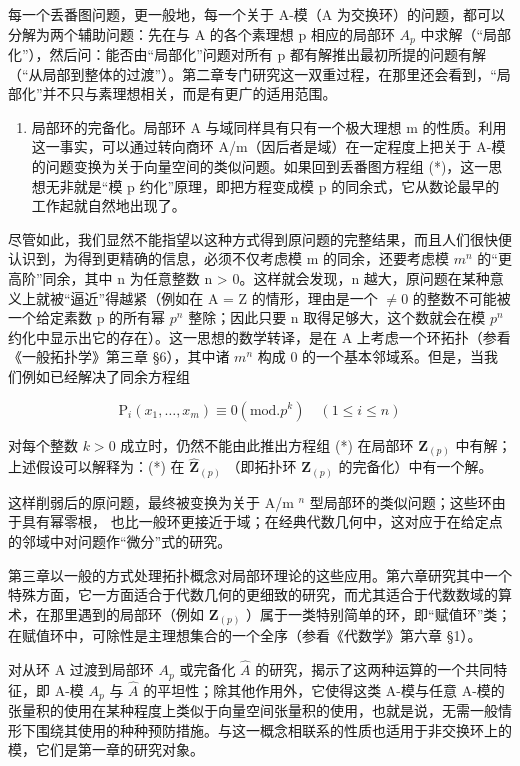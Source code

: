 每一个丢番图问题，更一般地，每一个关于 A-模（A 为交换环）的问题，都可以分解为两个辅助问题：先在与 A 的各个素理想 p 相应的局部环 \(A_{p}\) 中求解（“局部化”），然后问：能否由“局部化”问题对所有 p 都有解推出最初所提的问题有解（“从局部到整体的过渡”）。第二章专门研究这一双重过程，在那里还会看到，“局部化”并不只与素理想相关，而是有更广的适用范围。

\begin{enumerate}
\def\labelenumi{\Roman{enumi}.}
\setcounter{enumi}{1}
\tightlist
\item
  局部环的完备化。局部环 A 与域同样具有只有一个极大理想 m 的性质。利用这一事实，可以通过转向商环 A/m（因后者是域）在一定程度上把关于 A-模的问题变换为关于向量空间的类似问题。如果回到丢番图方程组 (*)，这一思想无非就是“模 p 约化”原理，即把方程变成模 p 的同余式，它从数论最早的工作起就自然地出现了。
\end{enumerate}

尽管如此，我们显然不能指望以这种方式得到原问题的完整结果，而且人们很快便认识到，为得到更精确的信息，必须不仅考虑模 m 的同余，还要考虑模 \(m^{n}\) 的“更高阶”同余，其中 n 为任意整数 n \textgreater{} 0。这样就会发现，n 越大，原问题在某种意义上就被“逼近”得越紧（例如在 A = Z 的情形，理由是一个 \(\neq 0\) 的整数不可能被一个给定素数 p 的所有幂 \(p^{n}\) 整除；因此只要 n 取得足够大，这个数就会在模 \(p^{n}\) 约化中显示出它的存在）。这一思想的数学转译，是在 A 上考虑一个环拓扑（参看《一般拓扑学》第三章 §6），其中诸 \(m^{n}\) 构成 0 的一个基本邻域系。但是，当我们例如已经解决了同余方程组

\[
\mathrm{P} _ {i} (x _ {1}, \dots , x _ {m}) \equiv 0 (\mathrm{mod.} p ^ {k}) \quad (1 \leqslant i \leqslant n)\tag{**}
\]

对每个整数 \(k > 0\) 成立时，仍然不能由此推出方程组 (*) 在局部环 \(\mathbf{Z}_{(p)}\) 中有解；上述假设可以解释为：(*) 在 \(\hat{\mathbf{Z}}_{(p)}\) （即拓扑环 \(\mathbf{Z}_{(p)}\) 的完备化）中有一个解。

这样削弱后的原问题，最终被变换为关于 A/m \(^{n}\) 型局部环的类似问题；这些环由于具有幂零根，
也比一般环更接近于域；在经典代数几何中，这对应于在给定点的邻域中对问题作“微分”式的研究。

第三章以一般的方式处理拓扑概念对局部环理论的这些应用。第六章研究其中一个特殊方面，它一方面适合于代数几何的更细致的研究，而尤其适合于代数数域的算术，在那里遇到的局部环（例如 \(\mathbf{Z}_{(p)}\) ）属于一类特别简单的环，即“赋值环”类；在赋值环中，可除性是主理想集合的一个全序（参看《代数学》第六章 §1）。

对从环 A 过渡到局部环 \(A_{p}\) 或完备化 \(\hat{A}\) 的研究，揭示了这两种运算的一个共同特征，即 A-模 \(A_{p}\) 与 \(\hat{A}\) 的平坦性；除其他作用外，它使得这类 A-模与任意 A-模的张量积的使用在某种程度上类似于向量空间张量积的使用，也就是说，无需一般情形下围绕其使用的种种预防措施。与这一概念相联系的性质也适用于非交换环上的模，它们是第一章的研究对象。

